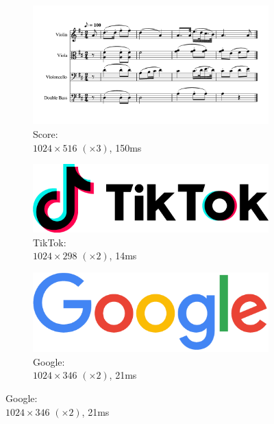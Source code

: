 \documentclass[UTF8]{ctexart}
\begin{document}
\begin{figure}[H]
    \ContinuedFloat
    \centering
    \begin{subfigure}[b]{\textwidth}
        \centering
        \includegraphics[width=\textwidth]{images/Score-1024x516-x3-150ms.png}
        \caption{Score: \\$1024 \times 516$ $(\times 3)$, 150ms}
    \end{subfigure}
    \par\bigskip
    \begin{subfigure}[b]{0.45\textwidth}
        \centering
        \includegraphics[width=\textwidth]{images/TikTok-1024x298-x2-14ms.png}
        \caption{TikTok: \\$1024 \times 298$ $(\times 2)$, 14ms}
    \end{subfigure}
    \hfill
    \begin{subfigure}[b]{0.45\textwidth}
        \centering
        \includegraphics[width=\textwidth]{images/Google-1024x346-x2-21ms.png}
        \caption{Google: \\$1024 \times 346$ $(\times 2)$, 21ms}

\end{subfigure}
\end{figure}
\end{document}
